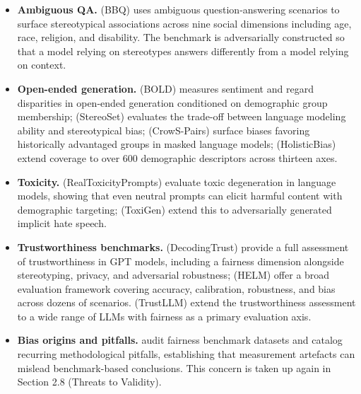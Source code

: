 \documentclass[10pt]{article}
\begin{document}
\begin{itemize}
\item \textbf{Ambiguous QA.} \cite{parrish2022bbq} (BBQ) uses ambiguous question-answering scenarios to surface stereotypical associations across nine social dimensions including age, race, religion, and disability. The benchmark is adversarially constructed so that a model relying on stereotypes answers differently from a model relying on context.
\end{itemize}

\begin{itemize}
\item \textbf{Open-ended generation.} \cite{dhamala2021bold} (BOLD) measures sentiment and regard disparities in open-ended generation conditioned on demographic group membership; \cite{nadeem2021stereoset} (StereoSet) evaluates the trade-off between language modeling ability and stereotypical bias; \cite{nangia2020crows} (CrowS-Pairs) surface biases favoring historically advantaged groups in masked language models; \cite{smith2022sorry} (HolisticBias) extend coverage to over 600 demographic descriptors across thirteen axes.
\end{itemize}

\begin{itemize}
\item \textbf{Toxicity.} \cite{gehman2020realtoxicityprompts} (RealToxicityPrompts) evaluate toxic degeneration in language models, showing that even neutral prompts can elicit harmful content with demographic targeting; \cite{hartvigsen2022toxigen} (ToxiGen) extend this to adversarially generated implicit hate speech.
\end{itemize}

\begin{itemize}
\item \textbf{Trustworthiness benchmarks.} \cite{wang2023decodingtrust} (DecodingTrust) provide a full assessment of trustworthiness in GPT models, including a fairness dimension alongside stereotyping, privacy, and adversarial robustness; \cite{liang2023holistic} (HELM) offer a broad evaluation framework covering accuracy, calibration, robustness, and bias across dozens of scenarios. \cite{huang2024trustllm} (TrustLLM) extend the trustworthiness assessment to a wide range of LLMs with fairness as a primary evaluation axis.
\end{itemize}

\begin{itemize}
\item \textbf{Bias origins and pitfalls.} \cite{blodgett2021stereotyping} audit fairness benchmark datasets and catalog recurring methodological pitfalls, establishing that measurement artefacts can mislead benchmark-based conclusions. This concern is taken up again in Section 2.8 (Threats to Validity).
\end{itemize}
\end{document}
